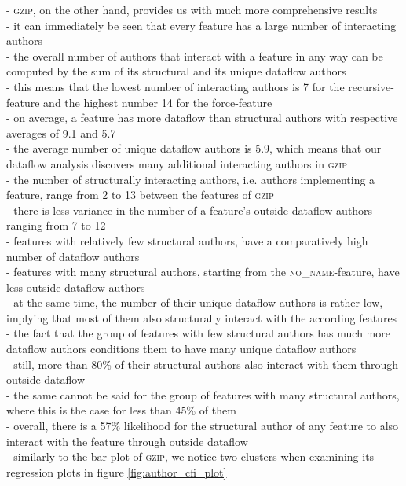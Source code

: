 - \textsc{gzip}, on the other hand, provides us with much more comprehensive results \\
- it can immediately be seen that every feature has a large number of interacting authors \\
- the overall number of authors that interact with a feature in any way can be computed by the sum of its structural and its unique dataflow authors \\
- this means that the lowest number of interacting authors is 7 for the \textsf{recursive}-feature and the highest number 14 for the \textsf{force}-feature \\
- on average, a feature has more dataflow than structural authors with respective averages of 9.1 and 5.7 \\
- the average number of unique dataflow authors is 5.9, which means that our dataflow analysis discovers many additional interacting authors in \textsc{gzip} \\
- the number of structurally interacting authors, i.e. authors implementing a feature, range from 2 to 13 between the features of \textsc{gzip} \\
- there is less variance in the number of a feature's outside dataflow authors ranging from 7 to 12 \\
- features with relatively few structural authors, have a comparatively high number of dataflow authors \\
- features with many structural authors, starting from the \textsc{no\_name}-feature, have less outside dataflow authors \\ 
- at the same time, the number of their unique dataflow authors is rather low, implying that most of them also structurally interact with the according features \\
- the fact that the group of features with few structural authors has much more dataflow authors conditions them to have many unique dataflow authors \\
- still, more than 80\% of their structural authors also interact with them through outside dataflow \\
- the same cannot be said for the group of features with many structural authors, where this is the case for less than 45\% of them \\
- overall, there is a 57\% likelihood for the structural author of any feature to also interact with the feature through outside dataflow \\
- similarly to the bar-plot of \textsc{gzip}, we notice two clusters when examining its regression plots in figure \ref{fig:author_cfi_plot} \\
